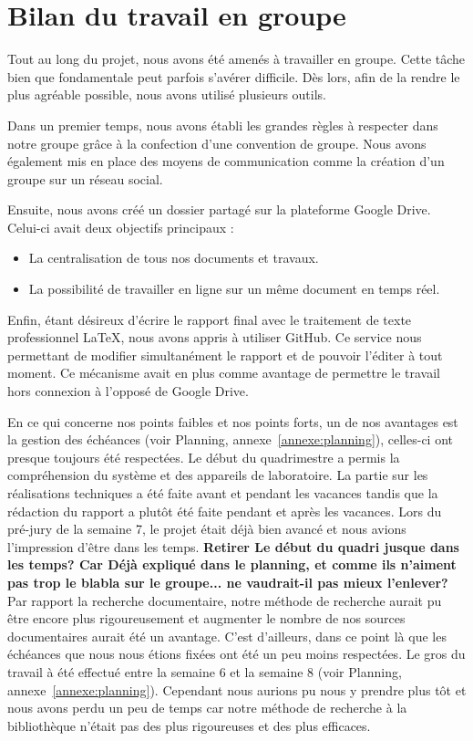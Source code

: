 \section{Bilan du travail en groupe}

Tout au long du projet, nous avons été amenés à travailler en groupe. Cette tâche bien que fondamentale peut parfois s'avérer difficile. Dès lors, afin de la rendre le plus agréable possible, nous avons utilisé plusieurs outils.

Dans un premier temps, nous avons établi les grandes règles à respecter dans notre groupe grâce à la confection d'une convention de groupe. Nous avons également mis en place des moyens de communication comme la création d'un groupe sur un réseau social.

Ensuite, nous avons créé un dossier partagé sur la plateforme Google Drive. Celui-ci avait deux objectifs principaux :
\begin{itemize}
\item La centralisation de tous nos documents et travaux.
\item La possibilité de travailler en ligne sur un même document en temps réel.
\end{itemize}

Enfin, étant désireux d'écrire le rapport final avec le traitement de texte professionnel \LaTeX, nous avons appris à utiliser GitHub. Ce service nous permettant de modifier simultanément le rapport et de pouvoir l'éditer à tout moment. Ce mécanisme avait en plus comme avantage de permettre le travail hors connexion à l'opposé de Google Drive.

En ce qui concerne nos points faibles et nos points forts, un de nos avantages est la gestion des échéances (voir Planning, annexe~\ref{annexe:planning}), celles-ci ont presque toujours été respectées. 
Le début du quadrimestre a permis la compréhension du système et des appareils de laboratoire. La partie sur les réalisations techniques a été faite avant et pendant les vacances tandis que la rédaction du rapport a plutôt été faite pendant et après les vacances. Lors du pré-jury de la semaine 7, le projet était déjà bien avancé et nous avions l'impression d'être dans les temps.
\textbf{Retirer \og Le début du quadri \fg jusque \og dans les temps\fg ? Car  Déjà expliqué dans le planning, et comme ils n'aiment pas trop le blabla sur le groupe... ne vaudrait-il pas mieux l'enlever? }
Par rapport la recherche documentaire, notre méthode de recherche aurait pu être encore plus rigoureusement et augmenter le nombre de nos sources documentaires aurait été un avantage. C'est d'ailleurs, dans ce point là que les échéances que nous nous étions fixées ont été un peu moins respectées. Le gros du travail à été effectué entre la semaine 6 et la semaine 8 (voir Planning, annexe~\ref{annexe:planning}). Cependant nous aurions pu nous y prendre plus tôt et nous avons perdu un peu de temps car notre méthode de recherche à la bibliothèque n'était pas des plus rigoureuses et des plus efficaces.


